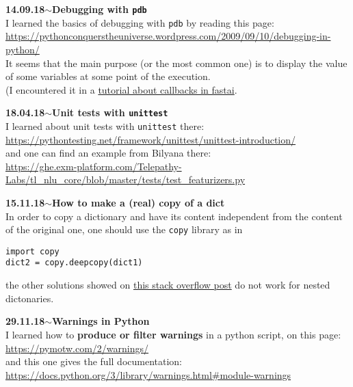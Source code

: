 \documentclass[11pt,a4paper]{article}
\newenvironment{loggentry}[2]%
{\noindent\textbf{#1}\hspace{1cm}$\mathbf{\sim}$\text{ }\textbf{#2}\\}{\vspace{0.5cm}}
\begin{document}
\begin{loggentry}{14.09.18}{Debugging with \texttt{pdb}}
I learned the basics of debugging with \texttt{pdb} by reading this page:\\
\url{https://pythonconquerstheuniverse.wordpress.com/2009/09/10/debugging-in-python/}\\
It seems that the main purpose (or the most common one) is to display the value of some variables at some point of the execution.\\
(I encountered it in a \href{https://github.com/sgugger/Deep-Learning/blob/master/Using%20the%20callback%20system%20in%20fastai.ipynb}{tutorial about callbacks in fastai}.\\
\end{loggentry}

\begin{loggentry}{18.04.18}{Unit tests with \texttt{unittest}}
I learned about unit tests with \texttt{unittest} there:\\
\url{https://pythontesting.net/framework/unittest/unittest-introduction/}\\
and one can find an example from Bilyana there:\\
\url{https://ghe.exm-platform.com/Telepathy-Labs/tl_nlu_core/blob/master/tests/test_featurizers.py}\\
\end{loggentry}

\begin{loggentry}{15.11.18}{How to make a (real) copy of a dict}
In order to copy a dictionary and have its content independent from the content of the original one, one should use the \texttt{copy} library as in
\begin{verbatim}
import copy
dict2 = copy.deepcopy(dict1)
\end{verbatim}
the other solutions showed on \href{https://stackoverflow.com/questions/2465921/how-to-copy-a-dictionary-and-only-edit-the-copy#2465932}{this stack overflow post} do not work for nested dictonaries.
\end{loggentry}

\begin{loggentry}{29.11.18}{Warnings in Python}
I learned how to \textbf{produce or filter warnings} in a python script, on this page:\\
\url{https://pymotw.com/2/warnings/}\\
and this one gives the full documentation:\\
\url{https://docs.python.org/3/library/warnings.html#module-warnings}\\
\end{loggentry}
\end{document}
